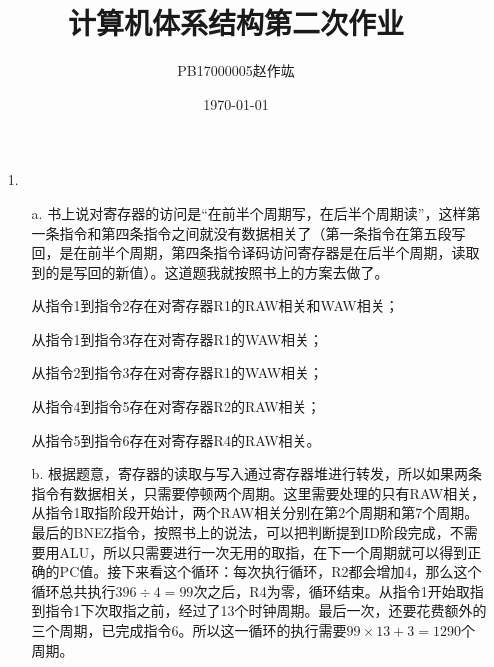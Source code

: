 \documentclass[UTF8,zihao=-4]{ctexart}
\title{\heiti 计算机体系结构\quad 第二次作业}
\author{\CJKfamily{namekai} PB17000005\quad 赵作竑}
\date{\kaishu \today}
\begin{document}
	\maketitle
	\begin{enumerate}
		\item[1.]
		\begin{enumerate}
			\item[a.]书上说对寄存器的访问是``在前半个周期写，在后半个周期读''，这样第一条指令和第四条指令之间就没有数据相关了（第一条指令在第五段写回，是在前半个周期，第四条指令译码访问寄存器是在后半个周期，读取到的是写回的新值）。这道题我就按照书上的方案去做了。

			从指令1到指令2存在对寄存器R1的RAW相关和WAW相关；

			从指令1到指令3存在对寄存器R1的WAW相关；

			从指令2到指令3存在对寄存器R1的WAW相关；

			从指令4到指令5存在对寄存器R2的RAW相关；

			从指令5到指令6存在对寄存器R4的RAW相关。

			\item[b.]根据题意，寄存器的读取与写入通过寄存器堆进行转发，所以如果两条指令有数据相关，只需要停顿两个周期。这里需要处理的只有RAW相关，从指令1取指阶段开始计，两个RAW相关分别在第2个周期和第7个周期。最后的BNEZ指令，按照书上的说法，可以把判断提到ID阶段完成，不需要用ALU，所以只需要进行一次无用的取指，在下一个周期就可以得到正确的PC值。接下来看这个循环：每次执行循环，R2都会增加4，那么这个循环总共执行$396\div 4=99$次之后，R4为零，循环结束。从指令1开始取指到指令1下次取指之前，经过了13个时钟周期。最后一次，还要花费额外的三个周期，已完成指令6。所以这一循环的执行需要$99\times 13+3=1290$个周期。


\end{enumerate}
\end{enumerate}
\end{document}
